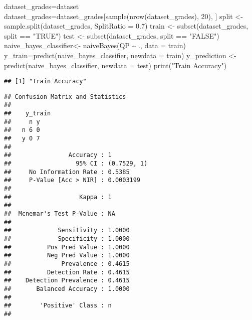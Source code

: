 \documentclass[
]{article}
\newenvironment{Shaded}{\begin{snugshade}}{\end{snugshade}}
\newcommand{\AttributeTok}[1]{\textcolor[rgb]{0.77,0.63,0.00}{#1}}
\newcommand{\DecValTok}[1]{\textcolor[rgb]{0.00,0.00,0.81}{#1}}
\newcommand{\FloatTok}[1]{\textcolor[rgb]{0.00,0.00,0.81}{#1}}
\newcommand{\FunctionTok}[1]{\textcolor[rgb]{0.00,0.00,0.00}{#1}}
\newcommand{\NormalTok}[1]{#1}
\newcommand{\OtherTok}[1]{\textcolor[rgb]{0.56,0.35,0.01}{#1}}
\newcommand{\SpecialCharTok}[1]{\textcolor[rgb]{0.00,0.00,0.00}{#1}}
\newcommand{\StringTok}[1]{\textcolor[rgb]{0.31,0.60,0.02}{#1}}
\begin{document}
\begin{Shaded}
\begin{Highlighting}[]
\NormalTok{dataset\_grades}\OtherTok{=}\NormalTok{dataset}
\NormalTok{dataset\_grades}\OtherTok{=}\NormalTok{dataset\_grades[}\FunctionTok{sample}\NormalTok{(}\FunctionTok{nrow}\NormalTok{(dataset\_grades), }\DecValTok{20}\NormalTok{), ]}
\NormalTok{split }\OtherTok{\textless{}{-}} \FunctionTok{sample.split}\NormalTok{(dataset\_grades, }\AttributeTok{SplitRatio =} \FloatTok{0.7}\NormalTok{) }
\NormalTok{train }\OtherTok{\textless{}{-}} \FunctionTok{subset}\NormalTok{(dataset\_grades, split }\SpecialCharTok{==} \StringTok{"TRUE"}\NormalTok{) }
\NormalTok{test }\OtherTok{\textless{}{-}} \FunctionTok{subset}\NormalTok{(dataset\_grades, split }\SpecialCharTok{==} \StringTok{"FALSE"}\NormalTok{)}
\NormalTok{naive\_bayes\_classifier}\OtherTok{\textless{}{-}} \FunctionTok{naiveBayes}\NormalTok{(QP }\SpecialCharTok{\textasciitilde{}}\NormalTok{ ., }\AttributeTok{data =}\NormalTok{ train)}
\NormalTok{y\_train}\OtherTok{=}\FunctionTok{predict}\NormalTok{(naive\_bayes\_classifier, }\AttributeTok{newdata =}\NormalTok{ train)}
\NormalTok{y\_prediction }\OtherTok{\textless{}{-}} \FunctionTok{predict}\NormalTok{(naive\_bayes\_classifier, }\AttributeTok{newdata =}\NormalTok{ test)}
\FunctionTok{print}\NormalTok{(}\StringTok{"Train Accuracy"}\NormalTok{)}
\end{Highlighting}
\end{Shaded}

\begin{verbatim}
## [1] "Train Accuracy"
\end{verbatim}

\begin{Shaded}
\end{Shaded}

\begin{verbatim}
## Confusion Matrix and Statistics
## 
##    y_train
##     n y
##   n 6 0
##   y 0 7
##                                      
##                Accuracy : 1          
##                  95% CI : (0.7529, 1)
##     No Information Rate : 0.5385     
##     P-Value [Acc > NIR] : 0.0003199  
##                                      
##                   Kappa : 1          
##                                      
##  Mcnemar's Test P-Value : NA         
##                                      
##             Sensitivity : 1.0000     
##             Specificity : 1.0000     
##          Pos Pred Value : 1.0000     
##          Neg Pred Value : 1.0000     
##              Prevalence : 0.4615     
##          Detection Rate : 0.4615     
##    Detection Prevalence : 0.4615     
##       Balanced Accuracy : 1.0000     
##                                      
##        'Positive' Class : n          
## 
\end{verbatim}
\end{document}
